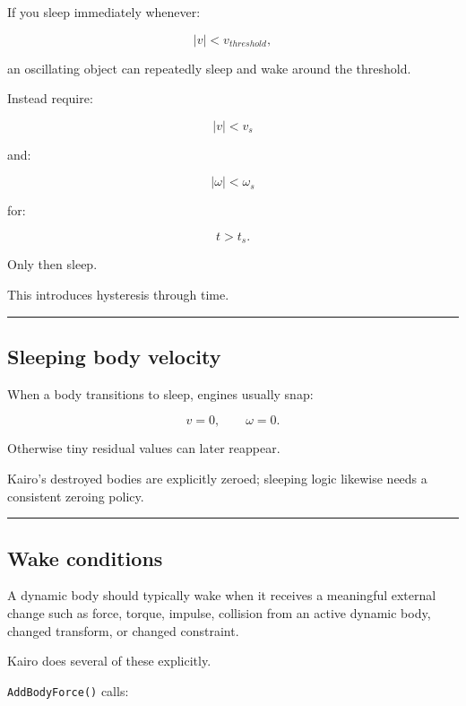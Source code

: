 If you sleep immediately whenever:

\[
|v|<v_{threshold},
\]

an oscillating object can repeatedly sleep and wake around the threshold.

Instead require:

\[
|v|<v_s
\]

and:

\[
|\omega|<\omega_s
\]

for:

\[
t>t_s.
\]

Only then sleep.

This introduces hysteresis through time.

\begin{center}\rule{0.5\linewidth}{0.5pt}\end{center}

\subsection{Sleeping body velocity}\label{06-engine-ii-ch037-sleeping-body-velocity}

\hypertarget{06-engine-ii-ch037-sleeping-body-velocity}{}

When a body transitions to sleep, engines usually snap:

\[
v=0,
\qquad
\omega=0.
\]

Otherwise tiny residual values can later reappear.

Kairo's destroyed bodies are explicitly zeroed; sleeping logic likewise needs a consistent zeroing policy.

\begin{center}\rule{0.5\linewidth}{0.5pt}\end{center}

\subsection{Wake conditions}\label{06-engine-ii-ch037-wake-conditions}

\hypertarget{06-engine-ii-ch037-wake-conditions}{}

A dynamic body should typically wake when it receives a meaningful external change such as force, torque, impulse, collision from an active dynamic body, changed transform, or changed constraint.

Kairo does several of these explicitly.

\texttt{AddBodyForce()} calls:

